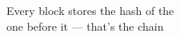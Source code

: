 \documentclass[preview]{standalone}
\begin{document}
\begin{center}
Every block stores the hash of the\\one before it --- that's the chain
\end{center}
\end{document}
